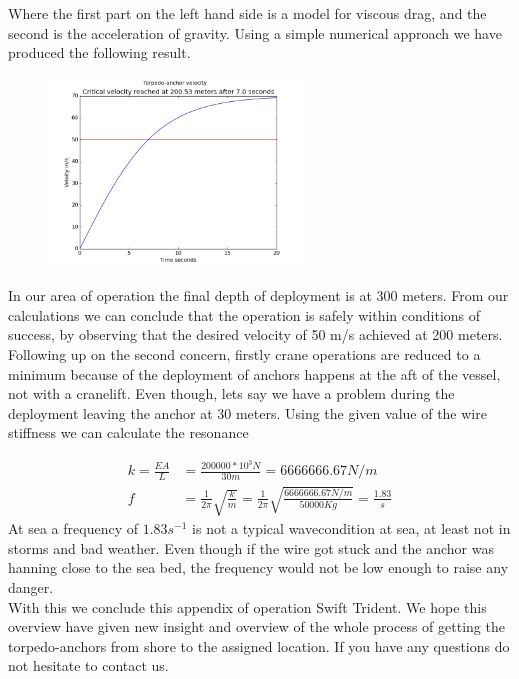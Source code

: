 \documentclass[a4paper,norsk]{article}
\begin{document}
Where the first part on the left hand side is a model for viscous drag, and the second is the acceleration of gravity. Using a simple numerical approach we have produced the following result.
\newpage
\begin{figure}[h!]
\centering
\includegraphics[width=0.6\textwidth]{velocity.jpg}
\end{figure}
In our area of operation the final depth of deployment is at 300 meters. From our calculations we can conclude that the operation is safely within conditions of success, by observing that the desired velocity of 50 m/s achieved at 200 meters.
\\
Following up on the second concern, firstly crane operations are reduced to a minimum because of the deployment of anchors happens at the aft of the vessel, not with a cranelift. Even though, lets say we have a problem during the deployment leaving the anchor at 30 meters. Using the given value of the wire stiffness we can calculate the resonance

\begin{align}
k = \frac{EA}{L} &= \frac{200 000 *10^3 N}{30 m} = 6666666.67 N/m \\
f &= \frac{1}{2\pi} \sqrt{\frac{k}{m}} = \frac{1}{2\pi} \sqrt{\frac{6666666.67 N/m}{50000 Kg}} = \frac{1.83}{s}
\end{align}
At sea a frequency of $1.83s^{-1}$ is not a typical wavecondition at sea, at least not in storms and bad weather. Even though if the wire got stuck and the anchor was hanning close to the sea bed, the frequency would not be low enough to raise any danger.
\\
With this we conclude this appendix of operation Swift Trident. We hope this overview have given new insight and overview of the whole process of getting the torpedo-anchors from shore to the assigned location. If you have any questions do not hesitate to contact us.
\end{document}
